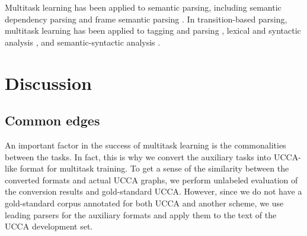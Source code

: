 \documentclass[11pt,a4paper]{article}
\begin{document}
Multitask learning has been applied to semantic parsing, including
semantic dependency parsing \cite{P17-1186} and
frame semantic parsing \cite{swayamdipta2017frame}.
In transition-based parsing, multitask learning has been applied to
tagging and parsing \cite{bohnet2012transition,Zhang2016StackpropagationIR},
lexical and syntactic analysis \cite{constant-nivre:2016:P16-1,more2016joint},
and semantic-syntactic analysis \cite{swayamdipta-EtAl:2016:CoNLL,henderson2013multilingual}.


\section{Discussion}\label{sec:discussion}

\subsection{Common edges}\label{sec:common}

An important factor in the success of multitask learning is the commonalities between the tasks.
In fact, this is why we convert the auxiliary tasks into UCCA-like format for multitask training.
To get a sense of the similarity between the converted formats and actual UCCA graphs,
we perform unlabeled evaluation of the conversion results and gold-standard UCCA.
However, since we do not have a gold-standard corpus annotated for both UCCA and another scheme,
we use leading parsers for the auxiliary formats and apply them to the text of the
UCCA development set.





\end{document}
